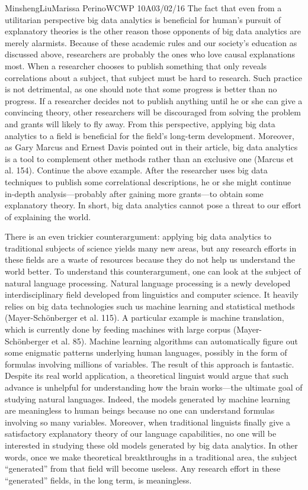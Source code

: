 \documentclass[12pt,letterpaper]{article}
\begin{document}
\begin{mla}{Minsheng}{Liu}{Marissa Perino}{WCWP 10A}{03/02/16}
The fact that even from a utilitarian perspective big data analytics is
beneficial for human's pursuit of explanatory theories is the other
reason those opponents of big data analytics are merely alarmists.
Because of these academic rules and our society's education as discussed
above, researchers are probably the ones who love causal explanations
most. When a researcher chooses to publish something that only reveals
correlations about a subject, that subject must be hard to research.
Such practice is not detrimental, as one should note that some progress
is better than no progress. If a researcher decides not to publish
anything until he or she can give a convincing theory, other researchers
will be discouraged from solving the problem and grants will likely to
fly away. From this perspective, applying big data analytics to a field
is beneficial for the field's long-term development. Moreover, as Gary
Marcus and Ernest Davis pointed out in their article, big data analytics
is a tool to complement other methods rather than an exclusive one
(Marcus et al. 154). Continue the above example. After the researcher
uses big data techniques to publish some correlational descriptions, he
or she might continue in-depth analysis---probably after gaining more
grants---to obtain some explanatory theory. In short, big data analytics
cannot pose a threat to our effort of explaining the world.

There is an even trickier counterargument: applying big data analytics
to traditional subjects of science yields many new areas, but any
research efforts in these fields are a waste of resources because they
do not help us understand the world better. To understand this
counterargument, one can look at the subject of natural language
processing. Natural language processing is a newly developed
interdisciplinary field developed from linguistics and computer science.
It heavily relies on big data technologies such us machine learning and
statistical methods (Mayer-Schönberger et al. 115). A particular example
is machine translation, which is currently done by feeding machines with
large corpus (Mayer-Schönberger et al. 85). Machine learning algorithms
can automatically figure out some enigmatic patterns underlying human
languages, possibly in the form of formulas involving millions of
variables. The result of this approach is fantastic. Despite its real
world application, a theoretical linguist would argue that such advance
is unhelpful for understanding how the brain works---the ultimate goal
of studying natural languages. Indeed, the models generated by machine
learning are meaningless to human beings because no one can understand
formulas involving so many variables. Moreover, when traditional
linguists finally give a satisfactory explanatory theory of our language
capabilities, no one will be interested in studying these old models
generated by big data analytics. In other words, once we make
theoretical breakthroughs in a traditional area, the subject
``generated'' from that field will become useless. Any research effort
in these ``generated'' fields, in the long term, is meaningless.


\end{mla}
\end{document}
